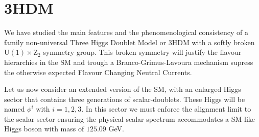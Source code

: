 
\newpage 

\chapter{3HDM}

We have studied the main features and the phenomenological  consistency of a family non-universal Three Higgs Doublet Model or 3HDM with a softly broken $\mathrm{U(1)\times Z_2} $ symmetry group. This broken symmetry will justify the flavour hierarchies in the SM and trough a Branco-Grimus-Lavoura mechanism supress the otherwise expected Flavour Changing Neutral Currents. 

Let us now consider an extended version of the SM, with an enlarged Higgs sector that contains three generations of scalar-doublets. These Higgs will be named $\phi^i$ with $i={1,2,3}$.  In this sector we must enforce the alignment limit to the scalar sector ensuring the physical scalar spectrum accommodates a SM-like Higgs boson with mass of $125.09$ GeV.